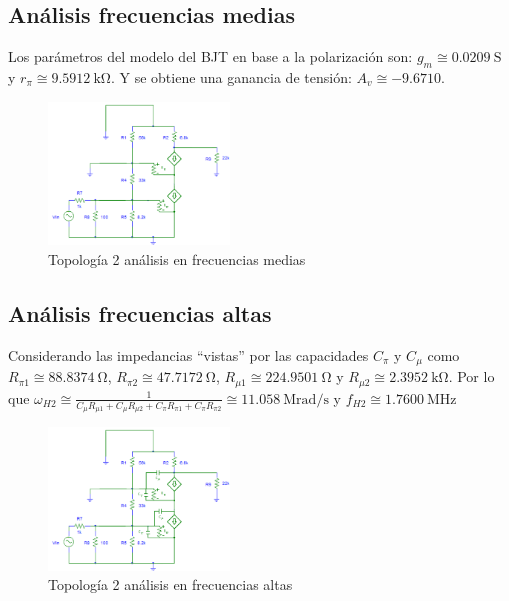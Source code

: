 \documentclass[letterpaper, 10 pt, conference]{ieeeconf}  %
\begin{document}
\subsection{Análisis frecuencias medias}
Los parámetros del modelo del BJT en base a la polarización son: $g_m \cong \qty{0.0209}{\siemens}$ y $r_{\pi} \cong \qty{9.5912}{\kilo\ohm}$. Y se obtiene una ganancia de tensión: $A_v \cong -9.6710$.

\begin{figure}[H]
 \centering
 \includegraphics[width=0.43\textwidth]{./Imagenes/topologia2_fm.png}
 \caption{Topología 2 análisis en frecuencias medias}
\end{figure}

\subsection{Análisis frecuencias altas}
Considerando las impedancias ``vistas'' por las capacidades $C_{\pi}$ y $C_{\mu}$ como $R_{\pi1} \cong \qty{88.8374}{\ohm}$, $R_{\pi2} \cong \qty{47.7172}{\ohm}$, $R_{\mu1} \cong \qty{224.9501}{\ohm}$ y $R_{\mu2} \cong \qty{2.3952}{\kilo\ohm}$. Por lo que $\omega_{H2} \cong \frac{1}{ C_{\mu}R_{\mu1} + C_{\mu}R_{\mu2} + C_{\pi}R_{\pi1} + C_{\pi}R_{\pi2} } \cong \qty{11.058}{\mega\radian\per\second}$ y $f_{H2} \cong \qty{1.7600}{\mega\hertz}$

\begin{figure}[H]
 \centering
 \includegraphics[width=0.43\textwidth]{./Imagenes/topologia2_fa.png}
 \caption{Topología 2 análisis en frecuencias altas}
\end{figure}
\end{document}
